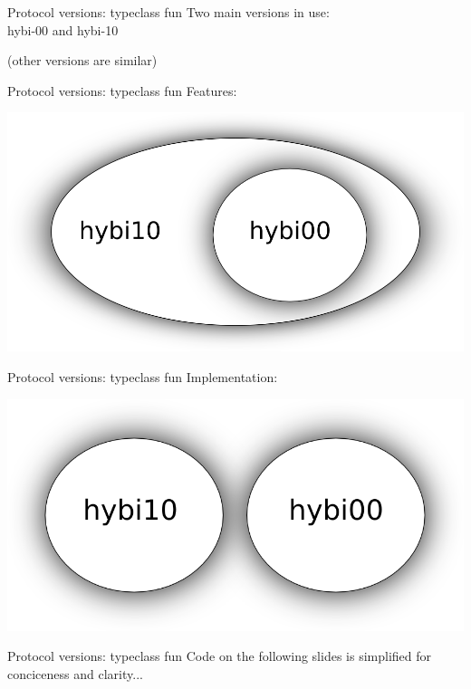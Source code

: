 \documentclass[20pt]{beamer}
\newcommand{\vspaced}{
    \vspace{5mm}
}
\begin{document}
\begin{frame}{Protocol versions: typeclass fun}
    Two main versions in use: \\
    hybi-00 and hybi-10 \\
    \vspaced
    \small{(other versions are similar)} \\
\end{frame}

\begin{frame}{Protocol versions: typeclass fun}
    Features:
    \begin{center}
    \includegraphics[width=\textwidth]{images/features.png}
    \end{center}
\end{frame}

\begin{frame}{Protocol versions: typeclass fun}
    Implementation:
    \begin{center}
    \includegraphics[width=\textwidth]{images/implementation.png}
    \end{center}
\end{frame}

\begin{frame}{Protocol versions: typeclass fun}
    Code on the following slides is simplified for conciceness and clarity...
\end{frame}
\end{document}
